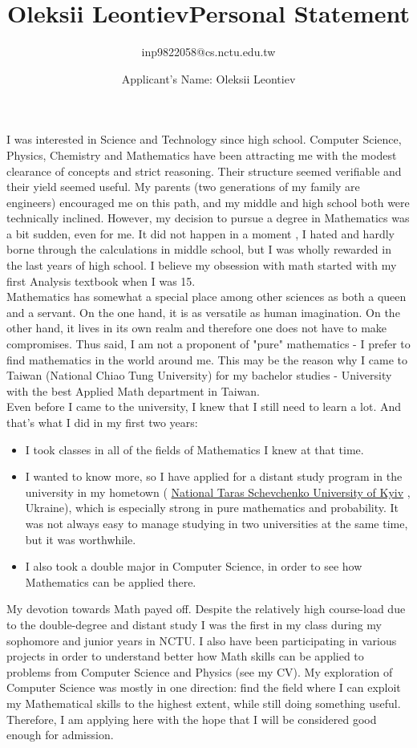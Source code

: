 \documentclass[10pt]{article}
\title{\bfseries\Huge Oleksii Leontiev}
\author{inp9822058@cs.nctu.edu.tw}
\date{}
\title{Personal Statement}
\author{Applicant's Name: Oleksii Leontiev}
\begin{document}
\maketitle
I was interested in Science and Technology since high school. Computer Science, Physics, Chemistry and Mathematics have been
attracting me with the modest clearance of concepts and strict reasoning. Their structure seemed verifiable and their yield seemed useful.
My parents (two generations of my family are engineers) encouraged me on this path, and my middle and high school both were technically inclined.
However, my decision to pursue a degree in Mathematics was a bit sudden, even for me. It did not happen in a moment
, I hated and hardly borne through the calculations in middle school, but I was wholly rewarded in the last years of high school. I believe
my obsession with math started with my first Analysis textbook when I was 15.\\
Mathematics has somewhat a special place among other sciences as both a queen and a servant. On the one hand, it is as versatile as human imagination.
On the other hand, it lives in its own realm and therefore one does not have to make compromises. Thus said, I am not a proponent
of "pure" mathematics - I prefer to find mathematics in the world around me. This may be the reason why I came to Taiwan (National Chiao Tung
University) for my bachelor studies - University with the best Applied Math department in Taiwan.
\\Even before I came to the university, I knew that I still need to learn a lot.
And that's what I did in my first two years:
\begin{itemize}
	\item{I took classes in all of the fields of Mathematics I knew at that time.}
	\item{I wanted to know more, so I have applied for a distant study program in the university in my hometown (
\href{http://mechmat.univ.kiev.ua/e/}{National Taras Schevchenko University of Kyiv}
, Ukraine), which is especially
strong in pure mathematics and probability. It was not always easy to manage studying in two universities at the same time, but it was
worthwhile.}
	\item{
I also took a
double major in Computer Science, in order to see how Mathematics can be applied there.
		}
\end{itemize}
My devotion towards Math payed off. Despite the relatively high course-load due to the double-degree and distant study I was the first in my class
during my sophomore and junior years in NCTU. I also have been participating in various projects in order to understand better how Math skills
can be applied to problems from Computer Science and Physics (see my CV).
My exploration of Computer Science was mostly in one direction: find the field where I can exploit my Mathematical skills to the highest extent,
while still doing something useful. 
Therefore, I am applying here with the hope that I will be considered good enough for admission.
\end{document}
